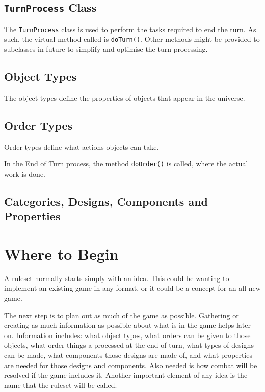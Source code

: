 \documentclass[a4paper,11pt]{report}
\newcommand{\codename}[1]{\texttt{#1}}
\begin{document}
\section{\codename{TurnProcess} Class}
\label{sec:turn-process}

The \codename{TurnProcess} class is used to perform the tasks required to end the turn. As such, the virtual method called is \codename{doTurn()}.  Other methods might be provided to subclasses in future to simplify and optimise the turn processing.

\section{Object Types}
\label{sec:object-types}

The object types define the properties of objects that appear in the universe.

\section{Order Types}
\label{sec:order-types}

Order types define what actions objects can take.

In the End of Turn process, the method \codename{doOrder()} is called, where the actual work is done.

\section{Categories, Designs, Components and Properties}
\label{sec:designs-components-properties}

\chapter{Where to Begin}
\label{chap:begin}

A ruleset normally starts simply with an idea. This could be wanting to implement an existing game in any format, or it could be a concept for an all new game.

The next step is to plan out as much of the game as possible. Gathering or creating as much information as possible about what is in the game helps later on. Information includes: what object types, what orders can be given to those objects, what order things a processed at the end of turn, what types of designs can be made, what components those designs are made of, and what properties are needed for those designs and components.  Also needed is how combat will be resolved if the game includes it.
Another important element of any idea is the name that the ruleset will be called.
\end{document}
